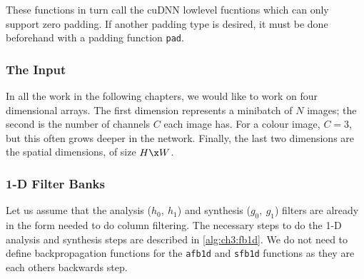 These functions in turn call the cuDNN lowlevel fucntions which can only support
zero padding. If another padding type is desired, it must be done beforehand
with a padding function \texttt{pad}.

\subsubsection{The Input}
In all the work in the following chapters, we would like to work on four
dimensional arrays. The first dimension represents a minibatch of $N$ images;
the second is the number of channels $C$ each image has. For a colour image,
$C=3$, but this often grows deeper in the network. Finally, the last two
dimensions are the spatial dimensions, of size $H\x W$. 

\subsubsection{1-D Filter Banks}
Let us assume that the analysis ($h_0,\ h_1$) and synthesis ($g_0,\ g_1$)
filters are already in the form needed to do column filtering. The necessary
steps to do the 1-D analysis and synthesis steps are described in
\autoref{alg:ch3:fb1d}. We do not need to define backpropagation functions for the
\texttt{afb1d} and \texttt{sfb1d} functions as they are each others backwards
step.

